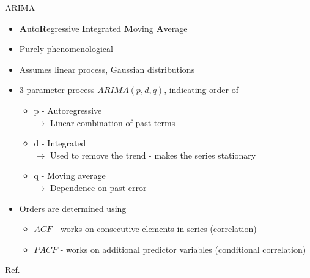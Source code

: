\documentclass[11pt,compress,aspectratio=1610]{beamer}
\begin{document}
\begin{frame}{ARIMA}
\begin{itemize}
    \item {\bf A}uto{\bf R}egressive {\bf I}ntegrated {\bf M}oving {\bf A}verage
    \item Purely phenomenological
    \item Assumes linear process, Gaussian distributions
    \item 3-parameter process $ARIMA(p,d,q)$, indicating order of
        \begin{itemize}
            \item p - Autoregressive \\
                    $\rightarrow$ Linear combination of past terms
            \item d - Integrated \\
                    $\rightarrow$ Used to remove the trend - makes the series stationary
            \item q - Moving average \\
                    $\rightarrow$ Dependence on past error
        \end{itemize}
	    \item Orders are determined using
	    \begin{itemize}
	        \item $ACF$ - works on consecutive elements in series (correlation)
	        \item $PACF$ - works on additional predictor variables (conditional correlation)
	    \end{itemize}
\end{itemize}
\vfill{\scriptsize Ref. \cite{Reyburn2011}}
\end{frame}
\end{document}
